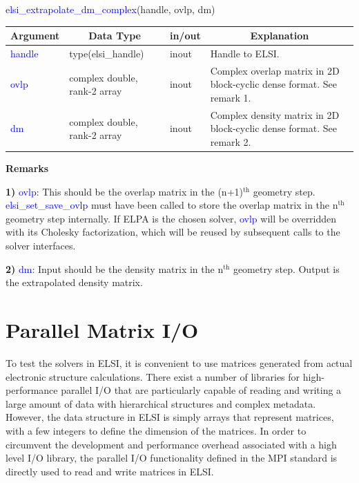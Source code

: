 \documentclass{report}
\begin{document}
\newpage
\begin{labeling}{\hspace{6cm}}
\item [\hspace{0.3cm} \textcolor{blue}{elsi\_extrapolate\_dm\_complex}(handle, ovlp, dm)]
\end{labeling}

\begin{tabular}[]{|p{20mm}|p{45mm}|p{15mm}|p{85mm}|}
\hline
\multicolumn{1}{|c|}{\textbf{Argument}} & \multicolumn{1}{c|}{\textbf{Data Type}} & \multicolumn{1}{c|}{\textbf{in/out}} & \multicolumn{1}{c|}{\textbf{Explanation}}\\
\hline
\textcolor{blue}{handle} & type(elsi\_handle)           & inout & Handle to ELSI.\\
\hline
\textcolor{blue}{ovlp}   & complex double, rank-2 array & inout & Complex overlap matrix in 2D block-cyclic dense format.  See remark 1.\\
\hline
\textcolor{blue}{dm}     & complex double, rank-2 array & inout & Complex density matrix in 2D block-cyclic dense format.  See remark 2.\\
\hline
\end{tabular}

\textbf{Remarks}

\textbf{1)} \textcolor{blue}{ovlp}:  This should be the overlap matrix in the (n+1)$^\text{th}$ geometry step.  \textcolor{blue}{elsi\_set\_save\_ovlp} must have been called to store the overlap matrix in the n$^\text{th}$ geometry step internally.  If ELPA is the chosen solver, \textcolor{blue}{ovlp} will be overridden with its Cholesky factorization, which will be reused by subsequent calls to the solver interfaces.

\textbf{2)} \textcolor{blue}{dm}:  Input should be the density matrix in the n$^\text{th}$ geometry step.  Output is the extrapolated density matrix.

\section{Parallel Matrix I/O}
\label{sec:rw}
To test the solvers in ELSI, it is convenient to use matrices generated from actual electronic structure calculations.  There exist a number of libraries for high-performance parallel I/O that are particularly capable of reading and writing a large amount of data with hierarchical structures and complex metadata.  However, the data structure in ELSI is simply arrays that represent matrices, with a few integers to define the dimension of the matrices.  In order to circumvent the development and performance overhead associated with a high level I/O library, the parallel I/O functionality defined in the MPI standard is directly used to read and write matrices in ELSI.
\end{document}
